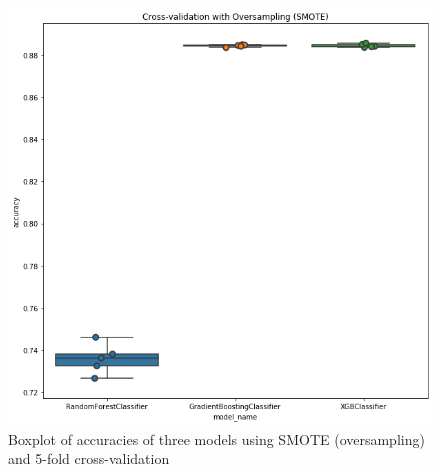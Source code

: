 \documentclass[letterpaper, 10 pt, conference]{ieeeconf}  %
\begin{document}
\begin{figure}[!hbt]
\centering
\includegraphics[width=1\columnwidth]{smotebp.png}
\caption{Boxplot of accuracies of three models using SMOTE (oversampling) and 5-fold cross-validation}
\label{osbp}
\end{figure}
\clearpage
\end{document}
